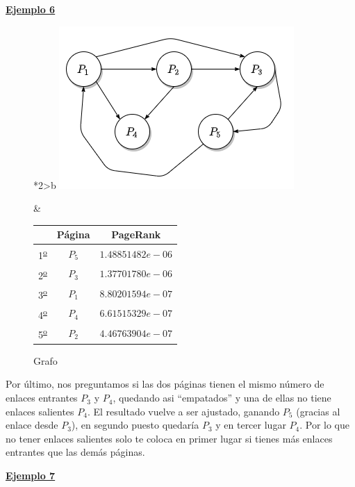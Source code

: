 \documentclass[size=a4, parskip=half, titlepage=false, toc=flat, toc=bib, 12pt]{scrartcl}
\theoremstyle{theorem-style}
\theoremstyle{definition-style}
\theoremstyle{remark-style}
\theoremstyle{example-style}
\theoremstyle{definition-style}
\theoremstyle{remark-style}
\begin{document}
\underline{\textbf{Ejemplo 6}}

\begin{figure}[!ht]
  \begin{tabular}{*{2}{>{\centering\arraybackslash}b{}}}
  \centering
    \includegraphics[scale=0.5]{./img/grafoej6}
    \caption{Grafo}
    &
      \renewcommand{\arraystretch}{1.3}
      \begin{tabular}{ccc}
        & Página & PageRank         \\ \hline
      1\textsuperscript{\underline{o}}} & $P_5$  & $1.48851482e-06$ \\ \hline
      2\textsuperscript{\underline{o}}} & $P_3$  & $1.37701780e-06$ \\ \hline
      3\textsuperscript{\underline{o}}} & $P_1$  & $8.80201594e-07$ \\ \hline
      4\textsuperscript{\underline{o}}} & $P_4$  & $6.61515329e-07$ \\ \hline
      5\textsuperscript{\underline{o}}} & $P_2$  & $4.46763904e-07$ \\ \hline
      \end{tabular}
    \end{tabular}
\end{figure}

Por último, nos preguntamos si las dos páginas tienen el mismo número de enlaces entrantes $P_3$ y $P_4$, quedando asi ``empatados'' y una de ellas no tiene enlaces salientes $P_4$. El resultado vuelve a ser ajustado, ganando $P_5$ (gracias al enlace desde $P_3$), en segundo puesto quedaría $P_3$ y en tercer lugar $P_4$. Por lo que no tener enlaces salientes solo te coloca en primer lugar si tienes más enlaces entrantes que las demás páginas.

\underline{\textbf{Ejemplo 7}}
\end{document}
